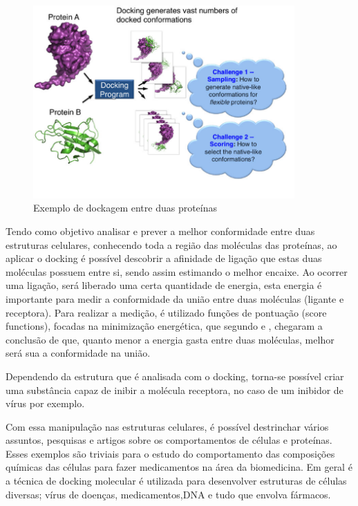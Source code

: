 \documentclass[tcc, capa]{texucpel}
\begin{document}
      \begin{figure}[!htb]
	\centering
 \cite{xue2015protein}
    \caption{Exemplo de dockagem entre duas proteínas}
    \includegraphics[width=10cm]{imagens/mostra_docking.png}
	\end{figure}
    
Tendo como objetivo analisar e prever a melhor conformidade entre duas estruturas celulares, conhecendo toda a região das moléculas das proteínas, ao aplicar o docking é possível descobrir a afinidade de ligação que estas duas moléculas possuem entre si, sendo assim estimando o melhor encaixe.
Ao ocorrer uma ligação, será liberado uma certa quantidade de energia, esta energia é importante para medir a conformidade da união entre duas moléculas (ligante e receptora).
Para realizar a medição, é utilizado funções de pontuação (score functions), focadas na minimização energética, que  segundo \cite{kitchen2004docking} e \cite{lybrand1995ligand}, chegaram a conclusão de que, quanto menor a energia gasta entre duas moléculas, melhor será sua a conformidade na união. 

Dependendo da estrutura que é analisada com o docking, torna-se possível criar uma substância capaz de inibir a molécula receptora, no caso de um inibidor de vírus por exemplo. \cite{ishikawa2011binding}

Com essa manipulação nas estruturas celulares, é possível destrinchar vários assuntos, pesquisas e artigos sobre os comportamentos de células e proteínas.
Esses exemplos são triviais para o estudo do comportamento das composições químicas das células para fazer medicamentos na área da biomedicina. 
Em geral é a técnica de docking molecular é utilizada para desenvolver estruturas de células diversas; vírus de doenças, medicamentos,DNA e tudo que envolva fármacos. 
\end{document}
